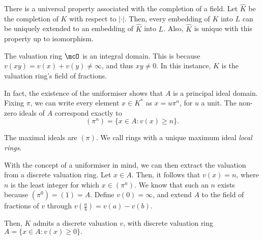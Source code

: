 \documentclass[a4paper, 12pt,oneside,openany]{book}
\begin{document}
There is a universal property associated with the completion of a field. Let $\hat{K}$ be the completion of $K$ with respect to $|\cdot|$. Then, every embedding of $K$ into $L$ can be uniquely extended to an embedding of $\hat{K}$ into $L$. Also, $\hat{K}$ is unique with this property up to isomorphism. 


The valuation ring $\mcO$ is an integral domain. This is because $v(xy)=v(x)+v(y) \neq \infty$, and thus $xy\neq 0.$ In this instance, $K$ is the valuation ring's field of fractions. 


In fact, the existence of the uniformiser shows that $A$ is a principal ideal domain. Fixing $\pi$, we can write every element $x\in K^*$ as $x=u\pi^n$, for $u$ a unit. The non-zero ideals of $A$ correspond exactly to $$(\pi^n)=\{x \in A:v(x)\geq n\}.$$ 

The maximal ideals are $(\pi)$. We call rings with a unique maximum ideal \emph{local rings}. 

With the concept of a uniformiser in mind, we can then extract the valuation from a discrete valuation ring. Let $x\in A$. Then, it follows that $v(x)=n$, where $n$ is the least integer for which $x \in (\pi^n)$. We know that such an $n$ exists because $(\pi^0)=(1)=A.$ Define $v(0)=\infty$, and extend $A$ to the field of fractions of $v$ through $v(\frac{a}{b})=v(a)-v(b)$. 

Then, $K$ admits a discrete valuation $v$, with discrete valuation ring $A=\{x \in A: v(x)\geq 0\}.$
\end{document}
